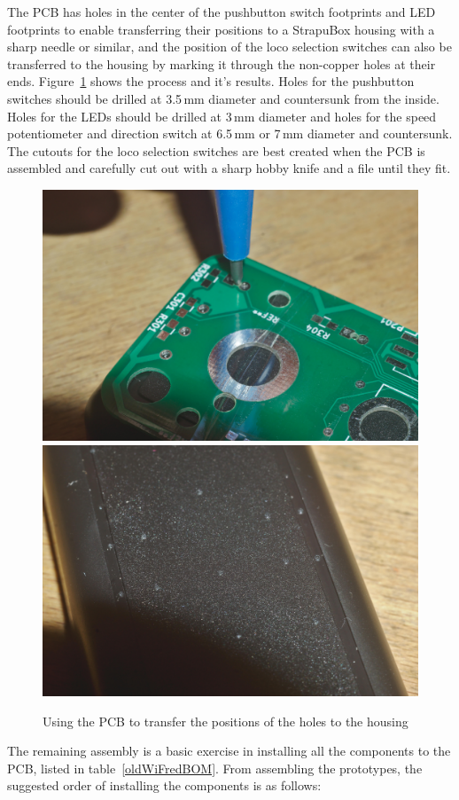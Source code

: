 \documentclass[11pt,a4paper]{scrartcl}
\begin{document}
The PCB has holes in the center of the pushbutton switch footprints and LED footprints to enable transferring their positions to a StrapuBox housing with a sharp needle or similar, and the position of the loco selection switches can also be transferred to the housing by marking it through the non-copper holes at their ends. Figure~\ref{oldTransferHoles} shows the process and it's results. Holes for the pushbutton switches should be drilled at 3.5\,mm diameter and countersunk from the inside. Holes for the LEDs should be drilled at 3\,mm diameter and holes for the speed potentiometer and direction switch at 6.5\,mm or 7\,mm diameter and countersunk. The cutouts for the loco selection switches are best created when the PCB is assembled and carefully cut out with a sharp hobby knife and a file until they fit.

\begin{figure}[tbh]
  \centering
  \includegraphics[width=0.49 \textwidth]{images/_DSC8652}
  \includegraphics[width=0.49 \textwidth]{images/_DSC8653}
  \caption{Using the PCB to transfer the positions of the holes to the housing}
  \label{oldTransferHoles}
\end{figure}

The remaining assembly is a basic exercise in installing all the components to the PCB, listed in table~\ref{oldWiFredBOM}. From assembling the prototypes, the suggested order of installing the components is as follows:
\end{document}
